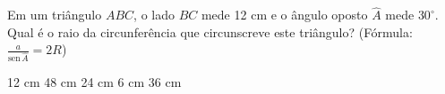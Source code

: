 Em um triângulo $ABC$, o lado $BC$ mede 12 cm e o ângulo oposto $\hat{A}$ mede $30^\circ$. Qual é o raio da circunferência que circunscreve este triângulo? (Fórmula: $\frac{a}{\text{sen}\,\hat{A}} = 2R$)

\parbox{\linewidth}{

12 cm
48 cm
24 cm
6 cm
36 cm

}




